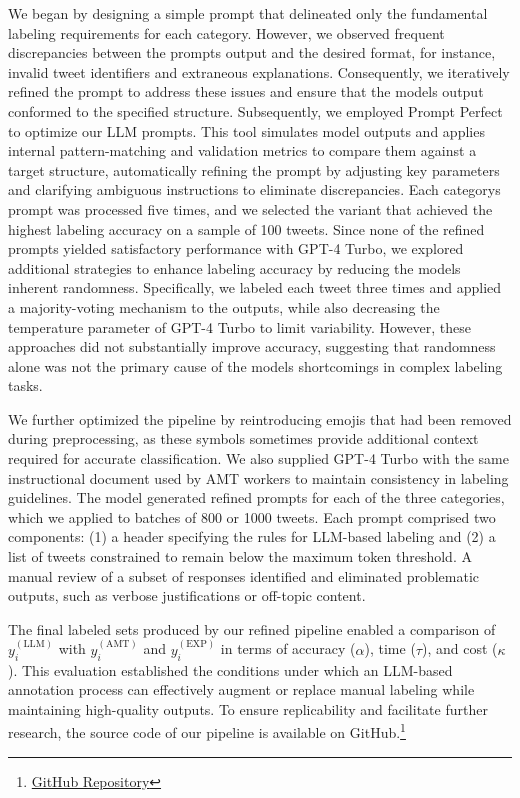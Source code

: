 \documentclass[letterpaper, 10 pt, conference]{ieeeconf} %
\begin{document}
We began by designing a simple prompt that delineated only the fundamental labeling requirements for each category. However, we observed frequent discrepancies between the prompt\textquotesingle{}s output and the desired format, for instance, invalid tweet identifiers and extraneous explanations. Consequently, we iteratively refined the prompt to address these issues and ensure that the model\textquotesingle{}s output conformed to the specified structure. Subsequently, we employed Prompt Perfect \cite{promptperfect} to optimize our LLM prompts. This tool simulates model outputs and applies internal pattern-matching and validation metrics to compare them against a target structure, automatically refining the prompt by adjusting key parameters and clarifying ambiguous instructions to eliminate discrepancies. Each category\textquotesingle{}s prompt was processed five times, and we selected the variant that achieved the highest labeling accuracy on a sample of 100 tweets.
Since none of the refined prompts yielded satisfactory performance with GPT-4 Turbo, we explored additional strategies to enhance labeling accuracy by reducing the model\textquotesingle{}s inherent randomness. Specifically, we labeled each tweet three times and applied a majority-voting mechanism to the outputs, while also decreasing the temperature parameter of GPT-4 Turbo to limit variability. However, these approaches did not substantially improve accuracy, suggesting that randomness alone was not the primary cause of the model\textquotesingle{}s shortcomings in complex labeling tasks.

We further optimized the pipeline by reintroducing emojis that had been removed during preprocessing, as these symbols sometimes provide additional context required for accurate classification. We also supplied GPT-4 Turbo with the same instructional document used by AMT workers to maintain consistency in labeling guidelines. The model generated refined prompts for each of the three categories, which we applied to batches of 800 or 1000 tweets. Each prompt comprised two components: (1) a header specifying the rules for LLM-based labeling and (2) a list of tweets constrained to remain below the maximum token threshold. A manual review of a subset of responses identified and eliminated problematic outputs, such as verbose justifications or off-topic content.

The final labeled sets produced by our refined pipeline enabled a comparison of $y_i^{(\mathrm{LLM})}$ with $y_i^{(\mathrm{AMT})}$ and $y_i^{(\mathrm{EXP})}$ in terms of accuracy ($\alpha$), time ($\tau$), and cost ($\kappa$). This evaluation established the conditions under which an LLM-based annotation process can effectively augment or replace manual labeling while maintaining high-quality outputs. To ensure replicability and facilitate further research,
the source code of our pipeline
is available on GitHub.\footnote{\href{https://github.com/HIVE-UofT/AMT-vs-LLMs}{GitHub Repository}}
\end{document}

